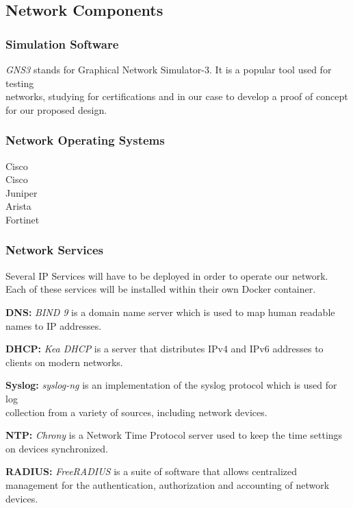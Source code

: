 \documentclass[12pt, letterpaper]{article}
\begin{document}
	\subsection{Network Components}
		\subsubsection{Simulation Software}
\textit{GNS3} stands for Graphical Network Simulator-3. It is a popular tool used for testing \\ networks, studying for certifications and in our  case to develop a proof of concept for our proposed design.
 
		\subsubsection{Network Operating Systems}
Cisco \\
Cisco \\
Juniper \\
Arista \\
Fortinet
		
\newpage

		\subsubsection{Network Services}
Several IP Services will have to be deployed in order to operate our network. Each of these services will be installed within their own Docker container.

\textbf{DNS:} \textit{BIND 9} is a domain name server which is used to map human readable names to IP addresses.

\smallskip

\textbf{DHCP:} \textit{Kea DHCP} is a server that distributes IPv4 and IPv6 addresses to clients on modern networks. 

\smallskip

\textbf{Syslog:} \textit{syslog-ng} is an implementation of the syslog protocol which is used for log \\ collection from a variety of sources, including network devices.

\smallskip

\textbf{NTP:} \textit{Chrony} is a Network Time Protocol server used to keep the time settings on devices synchronized.

\smallskip

\textbf{RADIUS:} \textit{FreeRADIUS} is a suite of software that allows centralized management for the authentication, authorization and accounting of network devices.
\end{document}
